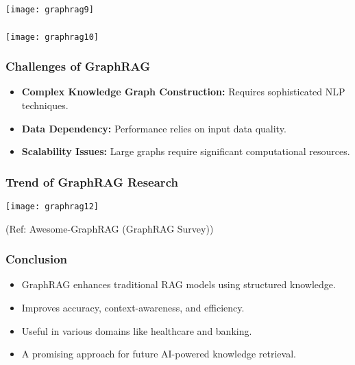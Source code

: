 \begin{frame}[fragile]\frametitle{}

	\begin{center}
	\texttt{[image: graphrag9]}
	\end{center}
	
\end{frame}

\begin{frame}[fragile]\frametitle{}

	\begin{center}
	\texttt{[image: graphrag10]}
	\end{center}
	
\end{frame}

\begin{frame}[fragile]\frametitle{Challenges of GraphRAG}
    \begin{itemize}
        \item \textbf{Complex Knowledge Graph Construction:} Requires sophisticated NLP techniques.
        \item \textbf{Data Dependency:} Performance relies on input data quality.
        \item \textbf{Scalability Issues:} Large graphs require significant computational resources.
    \end{itemize}
\end{frame}

\begin{frame}[fragile]\frametitle{Trend of GraphRAG Research}

	\begin{center}
	\texttt{[image: graphrag12]}
	\end{center}
	
		{\tiny (Ref: Awesome-GraphRAG (GraphRAG Survey))}

	
\end{frame}

\begin{frame}[fragile]\frametitle{Conclusion}
    \begin{itemize}
        \item GraphRAG enhances traditional RAG models using structured knowledge.
        \item Improves accuracy, context-awareness, and efficiency.
        \item Useful in various domains like healthcare and banking.
        \item A promising approach for future AI-powered knowledge retrieval.
    \end{itemize}
\end{frame}
